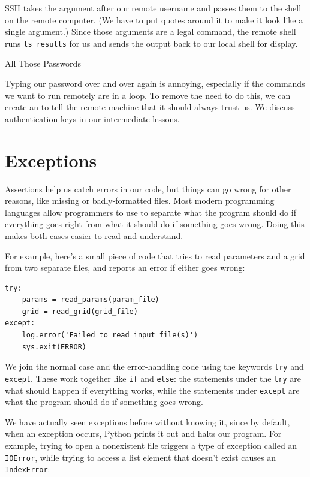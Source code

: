 \documentclass{book}
\begin{document}
SSH takes the argument after our remote username and passes them to the
shell on the remote computer. (We have to put quotes around it to make
it look like a single argument.) Since those arguments are a legal
command, the remote shell runs \texttt{ls results} for us and sends the
output back to our local shell for display.

\begin{swcbox}{All Those Passwords}

Typing our password over and over again is annoying, especially if the
commands we want to run remotely are in a loop. To remove the need to do
this, we can create an  to tell the remote machine that it should always trust us. We
discuss authentication keys in our intermediate lessons.

\end{swcbox}

\section{Exceptions}

Assertions help us catch errors in our code, but things can go wrong for
other reasons, like missing or badly-formatted files. Most modern
programming languages allow programmers to use
 to separate what the program should
do if everything goes right from what it should do if something goes
wrong. Doing this makes both cases easier to read and understand.

For example, here's a small piece of code that tries to read parameters
and a grid from two separate files, and reports an error if either goes
wrong:

\begin{verbatim}
try:
    params = read_params(param_file)
    grid = read_grid(grid_file)
except:
    log.error('Failed to read input file(s)')
    sys.exit(ERROR)
\end{verbatim}

We join the normal case and the error-handling code using the keywords
\texttt{try} and \texttt{except}. These work together like \texttt{if}
and \texttt{else}: the statements under the \texttt{try} are what should
happen if everything works, while the statements under \texttt{except}
are what the program should do if something goes wrong.

We have actually seen exceptions before without knowing it, since by
default, when an exception occurs, Python prints it out and halts our
program. For example, trying to open a nonexistent file triggers a type
of exception called an \texttt{IOError}, while trying to access a list
element that doesn't exist causes an \texttt{IndexError}:
\end{document}
